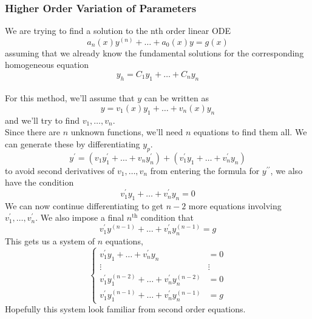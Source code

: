 \subsubsection{Higher Order Variation of Parameters}
\noindent
We are trying to find a solution to the nth order linear ODE
\begin{equation*}
	a_n(x)y^{(n)} + \ldots + a_0(x)y = g(x)
\end{equation*}
assuming that we already know the fundamental solutions for the corresponding homogeneous equation
\begin{equation*}
	y_h = C_1y_1 + \ldots + C_ny_n
\end{equation*}\\

\noindent
For this method, we'll assume that $y$ can be written as
\begin{equation*}
	y = v_1(x)y_1 + \ldots + v_n(x)y_n
\end{equation*}
and we'll try to find $v_1, \ldots, v_n$.\\

\noindent
Since there are $n$ unknown functions, we'll need $n$ equations to find them all. We can generate these by differentiating $y_p$.
\begin{equation*}
	y^\prime = \left(v_1y_1^\prime + \ldots + v_ny_n^\prime\right) + \left(v_1^\prime y_1 + \ldots + v_n^\prime y_n\right)
\end{equation*}
to avoid second derivatives of $v_1, \ldots, v_n$ from entering the formula for $y^{\prime\prime}$, we also have the condition
\begin{equation*}
	v_1^\prime y_1 + \ldots +v_n^\prime y_n = 0
\end{equation*}
We can now continue differentiating to get $n-2$ more equations involving $v_1^\prime, \ldots, v_n^\prime$. We also impose a final $n^{\text{th}}$ condition that
\begin{equation*}
	v_1^\prime y^{(n-1)} + \ldots + v_n^\prime y_n^{(n-1)} = g
\end{equation*}
This gets us a system of $n$ equations,
\begin{equation*}
	\begin{cases}
		v_1^\prime y_1 + \ldots + v_n^\prime y_n & = 0 \\
		\vdots & \vdots \\
		v_1^\prime y_1^{(n-2)} + \ldots + v_n^\prime y_n^{(n-2)} & = 0 \\
		v_1^\prime y_1^{(n-1)} + \ldots + v_n^\prime y_n^{(n-1)} & = g
	\end{cases} 
\end{equation*}
Hopefully this system look familiar from second order equations.\\

